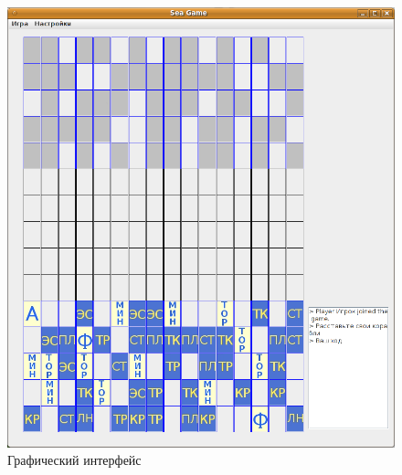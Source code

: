 \begin{figure}[ht]
\centering
\includegraphics[width=15cm]{images/srn1.png}
\caption{Графический интерфейс}
\label{srn1}
\end{figure}



\endinput
